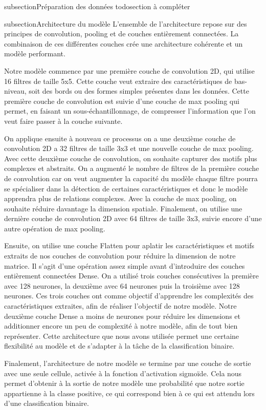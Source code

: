 subsection{Préparation des données}
todo{section à compléter}

subsection{Architecture du modèle}
L’ensemble de l’architecture repose sur des principes de convolution, pooling et de couches entièrement connectées. La combinaison de ces différentes couches crée une architecture cohérente et un modèle performant.

Notre modèle commence par une première couche de convolution 2D, qui utilise 16 filtres de taille 5x5. Cette couche veut extraire des caractéristiques de bas-niveau, soit des bords ou des formes simples présentes dans les données. Cette première couche de convolution est suivie d’une couche de max pooling qui permet, en faisant un sous-échantillonnage, de compresser l’information que l’on veut faire passer à la couche suivante.

On applique ensuite à nouveau ce processus  on a une deuxième couche de convolution 2D a 32 filtres de taille 3x3 et une nouvelle couche de max pooling. Avec cette deuxième couche de convolution, on souhaite capturer des motifs plus complexes et abstraits. On a augmenté le nombre de filtres de la première couche de convolution car on veut augmenter la capacité du modèle  chaque filtre pourra se spécialiser dans la détection de certaines caractéristiques et donc le modèle apprendra plus de relations complexes. Avec la couche de max pooling, on souhaite réduire davantage la dimension spatiale. Finalement, on utilise une dernière couche de convolution 2D avec 64 filtres de taille 3x3, suivie encore d’une autre opération de max pooling.

Ensuite, on utilise une couche Flatten pour aplatir les caractéristiques et motifs extraits de nos couches de convolution pour réduire la dimension de notre matrice. Il s’agit d’une opération assez simple avant d’introduire des couches entièrement connectées Dense. On a utilisé trois couches consécutives  la première avec 128 neurones, la deuxième avec 64 neurones puis la troisième avec 128 neurones. Ces trois couches ont comme objectif d’apprendre les complexités des caractéristiques extraites, afin de réaliser l’objectif de notre modèle. Notre deuxième couche Dense a moins de neurones pour réduire les dimensions et additionner encore un peu de complexité à notre modèle, afin de tout bien représenter. Cette architecture que nous avons utilisée permet une certaine flexibilité au modèle et de s’adapter à la tâche de la classification binaire.

Finalement, l’architecture de notre modèle se termine par une couche de sortie avec une seule cellule, activée à la fonction d’activation sigmoïde. Cela nous permet d’obtenir à la sortie de notre modèle une probabilité que notre sortie appartienne à la classe positive, ce qui correspond bien à ce qui est attendu lors d’une classification binaire.

